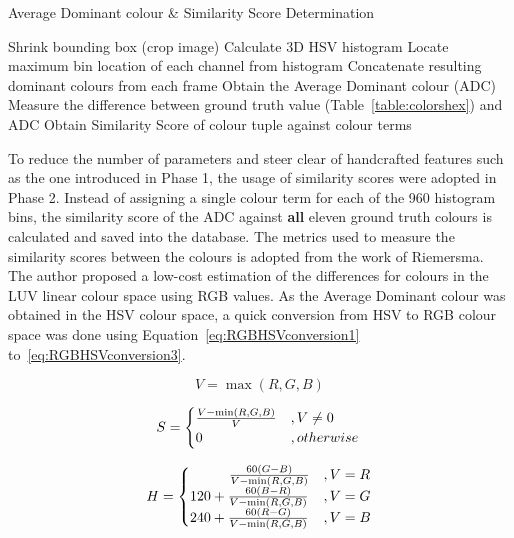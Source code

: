 \begin{algorithm}[H]
  \caption{Average Dominant colour \& Similarity Score Determination}
  \label{algo:ADC}
  \begin{algorithmic}[1]
        \STATE Shrink bounding box (crop image)
        \STATE Calculate 3D HSV histogram
        \STATE Locate maximum bin location of each channel from histogram
        \STATE Concatenate resulting dominant colours from each frame
        \STATE Obtain the Average Dominant colour (ADC)
        \STATE Measure the difference between ground truth value (Table~\ref{table:colorshex}) and ADC
        \STATE Obtain Similarity Score of colour tuple against colour terms
    \ENDFOR
  \end{algorithmic}
\end{algorithm}

To reduce the number of parameters and steer clear of handcrafted features such as the one introduced in Phase 1, the usage of similarity scores were adopted in Phase 2.
Instead of assigning a single colour term for each of the 960 histogram bins, the similarity score of the ADC against \textbf{all} eleven ground truth colours is calculated and saved into the database. The metrics used to measure the similarity scores between the colours is adopted from the work of Riemersma\cite{riemersma}. The author proposed a low-cost estimation of the differences for colours in the LUV linear colour space using RGB values. As the Average Dominant colour was obtained in the HSV colour space, a quick conversion from HSV to RGB colour space was done using Equation~\ref{eq:RGBHSVconversion1} to~\ref{eq:RGBHSVconversion3}.



\begin{equation}
\label{eq:RGBHSVconversion1}
V = \max(R,G,B)
\end{equation}

\begin{equation}
\label{eq:RGBHSVconversion2}
S = \begin{cases}\frac{V - \min(R,G,B)}{V} & , V \neq 0\\
0 & , otherwise \end{cases} \\
\end{equation}

\begin{equation}
\label{eq:RGBHSVconversion3}
H = \begin{cases}
\hspace{2.8em} \frac{60(G-B)}{V-\min(R,G,B)} & ,V = R\\
120 + \frac{60(B-R)}{V-\min(R,G,B)} & ,V = G\\
240 + \frac{60(R-G)}{V-\min(R,G,B)} & ,V = B
\end{cases}
\end{equation}

